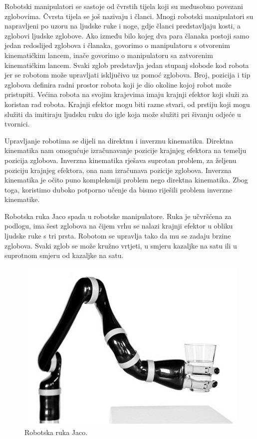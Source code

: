 \documentclass[times,utf8,diplomski]{fer}
\begin{document}
Robotski manipulatori se sastoje od čvrstih tijela koji su međusobno povezani zglobovima. \citep{robotics} Čvrsta tijela se još nazivaju i članci. Mnogi robotski manipulatori su napravljeni po uzoru na ljudske ruke i noge, gdje članci predstavljaju kosti, a zglobovi ljudske zglobove. Ako između bilo kojeg dva para članaka postoji samo jedan redoslijed zglobova i članaka, govorimo o manipulatoru s otvorenim kinematičkim lancem, inače govorimo o manipulatoru sa zatvorenim kinematičkim lancem. Svaki zglob predstavlja jedan stupanj slobode kod robota jer se robotom može upravljati isključivo uz pomoć zglobova. Broj, pozicija i tip zglobova definira radni prostor robota koji je dio okoline kojoj robot može pristupiti. Većina robota na svojim krajevima imaju krajnji efektor koji služi za koristan rad robota. Krajnji efektor mogu biti razne stvari, od prstiju koji mogu služiti da imitiraju ljudsku ruku do igle koja može služiti pri šivanju odjeće u tvornici.

Upravljanje robotima se dijeli na direktnu i inverznu kinematiku. Direktna kinematika nam omogućuje izračunavanje pozicije krajnjeg
efektora na temelju pozicija zglobova. Inverzna kinematika rješava suprotan problem, za željenu poziciju krajnjeg efektora, ona nam izračunava pozicije zglobova. Inverzna kinematika je očito puno kompleksniji problem nego direktna kinematika. Zbog toga, koristimo duboko potporno učenje da bismo riješili problem inverzne kinematike.

Robotska ruka Jaco spada u robotske manipulatore. Ruka je učvršćena za podlogu, ima šest zglobova na čijem vrhu se nalazi krajnji efektor u obliku ljudske ruke s tri prsta. Robotom se upravlja tako da mu se zadaju brzine zglobova. Svaki zglob se može kružno vrtjeti, u smjeru kazaljke na satu ili u suprotnom smjeru od kazaljke na satu.

\begin{figure}[ht!]
	\centering
	\includegraphics[width=\columnwidth]{img/jaco.png}
	\caption{Robotska ruka Jaco.\protect\footnotemark}
	\label{fig:jaco}
\end{figure}
\end{document}
